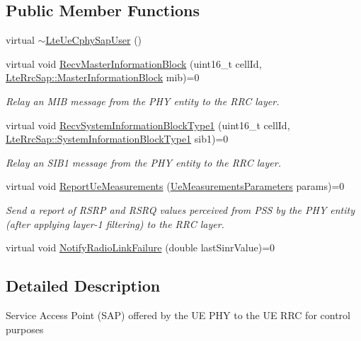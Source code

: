 \subsection*{Public Member Functions}
\begin{DoxyCompactItemize}
\item 
virtual \hyperlink{classns3_1_1LteUeCphySapUser_af7ed6f163606e0fb0c5a795a887d8836}{$\sim$\+Lte\+Ue\+Cphy\+Sap\+User} ()
\item 
virtual void \hyperlink{classns3_1_1LteUeCphySapUser_a6b48cc819f095ed29a7580f94f6765ec}{Recv\+Master\+Information\+Block} (uint16\+\_\+t cell\+Id, \hyperlink{structns3_1_1LteRrcSap_1_1MasterInformationBlock}{Lte\+Rrc\+Sap\+::\+Master\+Information\+Block} mib)=0
\begin{DoxyCompactList}\small\item\em Relay an M\+IB message from the P\+HY entity to the R\+RC layer. \end{DoxyCompactList}\item 
virtual void \hyperlink{classns3_1_1LteUeCphySapUser_aac4ef620b88531ba04617e024392a73e}{Recv\+System\+Information\+Block\+Type1} (uint16\+\_\+t cell\+Id, \hyperlink{structns3_1_1LteRrcSap_1_1SystemInformationBlockType1}{Lte\+Rrc\+Sap\+::\+System\+Information\+Block\+Type1} sib1)=0
\begin{DoxyCompactList}\small\item\em Relay an S\+I\+B1 message from the P\+HY entity to the R\+RC layer. \end{DoxyCompactList}\item 
virtual void \hyperlink{classns3_1_1LteUeCphySapUser_a123269edd972ce8452847a88b0753396}{Report\+Ue\+Measurements} (\hyperlink{structns3_1_1LteUeCphySapUser_1_1UeMeasurementsParameters}{Ue\+Measurements\+Parameters} params)=0
\begin{DoxyCompactList}\small\item\em Send a report of R\+S\+RP and R\+S\+RQ values perceived from P\+SS by the P\+HY entity (after applying layer-\/1 filtering) to the R\+RC layer. \end{DoxyCompactList}\item 
virtual void \hyperlink{classns3_1_1LteUeCphySapUser_a9006571d5129b8b462a4ab105371eb33}{Notify\+Radio\+Link\+Failure} (double last\+Sinr\+Value)=0
\end{DoxyCompactItemize}


\subsection{Detailed Description}
Service Access Point (S\+AP) offered by the UE P\+HY to the UE R\+RC for control purposes


